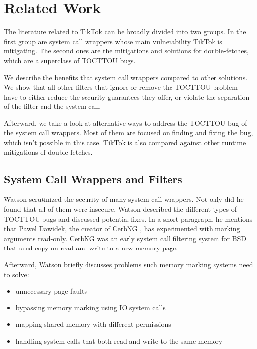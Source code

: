 \section{Related Work}
\label{sec:relatedwork}

The literature related to TikTok can be broadly divided into two groups. In the
first group are system call wrappers whose main vulnerability TikTok is
mitigating. The second ones are the mitigations and solutions for
double-fetches, which are a superclass of TOCTTOU bugs.

We describe the benefits that system call wrappers compared to other solutions.
We show that all other filters that ignore or remove the TOCTTOU problem have
to either reduce the security guarantees they offer, or violate the separation
of the filter and the system call.

Afterward, we take a look at alternative ways to address the TOCTTOU bug of the
system call wrappers. Most of them are focused on finding and fixing the bug,
which isn't possible in this case. TikTok is also compared against other runtime
mitigations of double-fetches.

\subsection{System Call Wrappers and Filters}

 Watson \cite{watson2007exploiting} scrutinized the security of many system call
wrappers. Not only did he found that all of them were insecure, Watson
 described the different types of TOCTTOU bugs and discussed potential fixes. In
a short paragraph, he mentions that Pawel Dawidek, the creator of CerbNG
\cite{zak_frasunek_dawidek}, has experimented with marking arguments read-only.
CerbNG was an early system call filtering system for BSD that used
copy-on-read-and-write to a new memory page.

Afterward, Watson briefly discusses problems such memory marking systems
need to solve: 
\begin{itemize}
    \item unnecessary page-faults
    \item bypassing memory marking using IO system calls
    \item mapping shared memory with different permissions
    \item handling system calls that both read and write to the same memory
\end{itemize}

